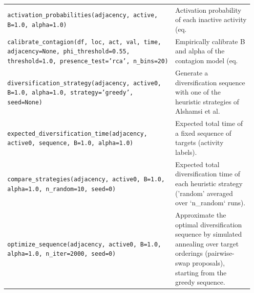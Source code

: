 \begin{longtable}{>{\raggedright\arraybackslash}p{9.2cm} >{\raggedright\arraybackslash}p{7.0cm}}
\texttt{\footnotesize activation\_probabilities(adjacency, active, B=1.0, alpha=1.0)} & {\small Activation probability of each inactive activity (eq.} \\[2pt]
\texttt{\footnotesize calibrate\_contagion(df, loc, act, val, time, adjacency=None, phi\_threshold=0.55, threshold=1.0, presence\_test='rca', n\_bins=20)} & {\small Empirically calibrate B and alpha of the contagion model (eq.} \\[2pt]
\texttt{\footnotesize diversification\_strategy(adjacency, active0, B=1.0, alpha=1.0, strategy='greedy', seed=None)} & {\small Generate a diversification sequence with one of the heuristic strategies of Alshamsi et al.} \\[2pt]
\texttt{\footnotesize expected\_diversification\_time(adjacency, active0, sequence, B=1.0, alpha=1.0)} & {\small Expected total time of a fixed sequence of targets (activity labels).} \\[2pt]
\texttt{\footnotesize compare\_strategies(adjacency, active0, B=1.0, alpha=1.0, n\_random=10, seed=0)} & {\small Expected total diversification time of each heuristic strategy ('random' averaged over `n\_random` runs).} \\[2pt]
\texttt{\footnotesize optimize\_sequence(adjacency, active0, B=1.0, alpha=1.0, n\_iter=2000, seed=0)} & {\small Approximate the optimal diversification sequence by simulated annealing over target orderings (pairwise-swap proposals), starting from the greedy sequence.} \\[2pt]
\bottomrule
\end{longtable}

